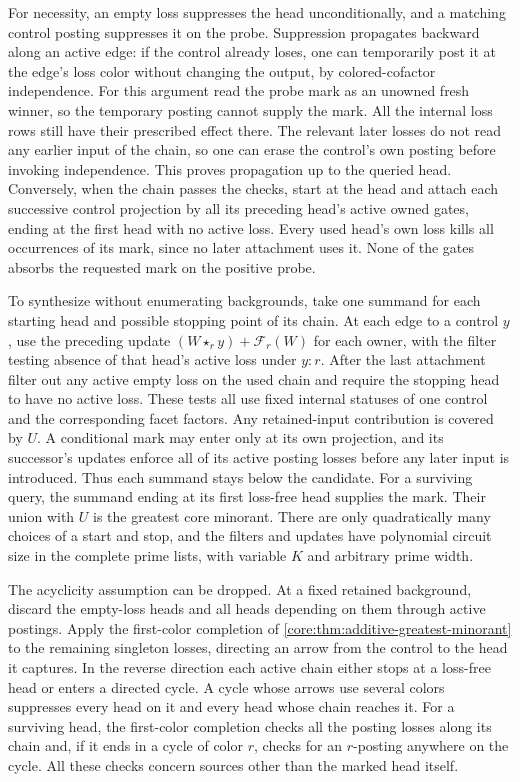 For necessity, an empty loss suppresses the head
unconditionally, and a matching control posting
suppresses it on the probe. Suppression propagates
backward along an active edge: if the control
already loses, one can temporarily post it at
the edge's loss color without changing the
output, by colored-cofactor independence.
For this argument read the probe mark as an
unowned fresh winner, so the temporary posting
cannot supply the mark. All the internal loss
rows still have their prescribed effect there.
The relevant later losses do not read any
earlier input of the chain, so one can erase
the control's own posting before invoking
independence. This proves propagation up to
the queried head. Conversely, when the chain
passes the checks, start at the head and attach
each successive control projection by all its
preceding head's active owned gates, ending at
the first head with no active loss. Every used
head's own loss kills all occurrences of its
mark, since no later attachment uses it.
None of the gates absorbs the requested mark
on the positive probe.

To synthesize without enumerating backgrounds,
take one summand for each starting head and
possible stopping point of its chain. At each
edge to a control $y$, use the preceding update
$(W\star_r y)+\mathcal F_r(W)$ for each owner,
with the filter testing absence of that
head's active loss under $y:r$. After the last
attachment filter out any active empty loss
on the used chain and require the stopping
head to have no active loss. These tests all
use fixed internal statuses of one control
and the corresponding facet factors. Any
retained-input contribution is covered by
$U$. A conditional mark may enter only at
its own projection, and its successor's
updates enforce all of its active posting
losses before any later input is introduced.
Thus each summand stays below the candidate.
For a surviving query, the summand ending
at its first loss-free head supplies the
mark. Their union with $U$ is the greatest
core minorant. There are only quadratically
many choices of a start and stop, and the
filters and updates have polynomial circuit
size in the complete prime lists, with
variable $K$ and arbitrary prime width.

The acyclicity assumption can be dropped. At a fixed
retained background, discard the empty-loss heads and
all heads depending on them through active postings.
Apply the first-color completion of
\cref{core:thm:additive-greatest-minorant} to the
remaining singleton losses, directing an arrow from
the control to the head it captures. In the reverse
direction each active chain either stops at a loss-free
head or enters a directed cycle. A cycle whose arrows
use several colors suppresses every head on it and
every head whose chain reaches it. For a surviving
head, the first-color completion checks all the posting
losses along its chain and, if it ends in a cycle of
color $r$, checks for an $r$-posting anywhere on the
cycle. All these checks concern sources other than the
marked head itself.

